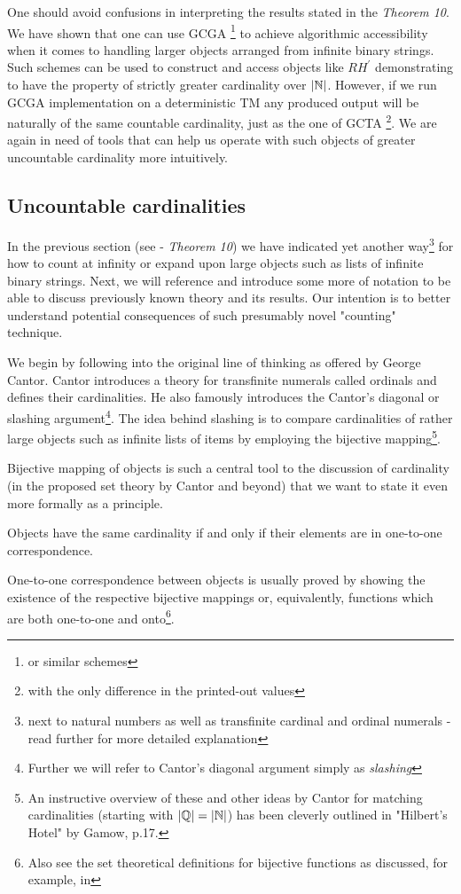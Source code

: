 One should avoid confusions in interpreting the results stated in the \textit{Theorem 10}. We have shown that one can use GCGA \footnote{or similar schemes} to achieve algorithmic accessibility when it comes to handling larger objects arranged from infinite binary strings. Such schemes can be used to construct and access objects like $RH^\prime$ demonstrating to have the property of strictly greater cardinality over $|\mathbb{N}|$. However, if we run GCGA implementation on a deterministic TM any produced output will be naturally of the same countable cardinality, just as the one of GCTA \footnote{with the only difference in the printed-out values}. We are again in need of tools that can help us operate with such objects of greater uncountable cardinality more intuitively.

\subsection{Uncountable cardinalities}

In the previous section (see - \textit{Theorem 10}) we have indicated yet another way\footnote{next to natural numbers as well as transfinite cardinal and ordinal numerals - read further for more detailed explanation} for how to count at infinity or expand upon large objects such as lists of infinite binary strings. Next, we will reference and introduce some more of notation to be able to discuss previously known theory and its results. Our intention is to better understand potential consequences of such presumably novel "counting" technique.

We begin by following into the original line of thinking as offered by George Cantor. Cantor introduces a theory for transfinite numerals called ordinals and defines their cardinalities. He also famously introduces the Cantor's diagonal or slashing argument\footnote{Further we will refer to Cantor's diagonal argument simply as \textit{slashing}}. The idea behind slashing is to compare cardinalities of rather large objects such as infinite lists of items by employing the bijective mapping\footnote{An instructive overview of these and other ideas by Cantor\cite{cantor1915contributions} for matching cardinalities (starting with $|\mathbb{Q}| = |\mathbb{N}|$) has been cleverly outlined in "Hilbert's Hotel" by Gamow\cite{gamow1988one}, p.17.}. 

Bijective mapping of objects is such a central tool to the discussion of cardinality (in the proposed set theory by Cantor and beyond) that we want to state it even more formally as a principle.
\begin{principle}\label{principle_1to1_cor}
  Objects have the same cardinality if and only if their elements are in one-to-one correspondence. 
\end{principle}
One-to-one correspondence between objects is usually proved by showing the existence of the respective bijective mappings or, equivalently, functions which are both one-to-one and onto\footnote{Also see the set theoretical definitions for bijective functions as discussed, for example, in\cite{goldrei1996classic, kunen1980set, jech2003set}}.

